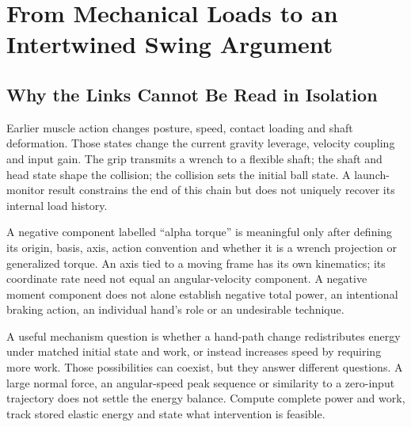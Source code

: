 \documentclass[11pt,a4paper]{article}
\begin{document}
\section{From Mechanical Loads to an Intertwined Swing Argument}
\subsection{Why the Links Cannot Be Read in Isolation}
Earlier muscle action changes posture, speed, contact loading and shaft deformation. Those states change the current gravity leverage, velocity coupling and input gain. The grip transmits a wrench to a flexible shaft; the shaft and head state shape the collision; the collision sets the initial ball state. A launch-monitor result constrains the end of this chain but does not uniquely recover its internal load history.

A negative component labelled ``alpha torque'' is meaningful only after defining its origin, basis, axis, action convention and whether it is a wrench projection or generalized torque. An axis tied to a moving frame has its own kinematics; its coordinate rate need not equal an angular-velocity component. A negative moment component does not alone establish negative total power, an intentional braking action, an individual hand's role or an undesirable technique.

A useful mechanism question is whether a hand-path change redistributes energy under matched initial state and work, or instead increases speed by requiring more work. Those possibilities can coexist, but they answer different questions. A large normal force, an angular-speed peak sequence or similarity to a zero-input trajectory does not settle the energy balance. Compute complete power and work, track stored elastic energy and state what intervention is feasible.
\end{document}
